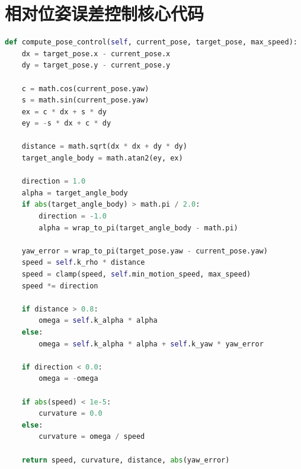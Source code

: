 \section{相对位姿误差控制核心代码}

\begin{lstlisting}[language=Python]
def compute_pose_control(self, current_pose, target_pose, max_speed):
    dx = target_pose.x - current_pose.x
    dy = target_pose.y - current_pose.y

    c = math.cos(current_pose.yaw)
    s = math.sin(current_pose.yaw)
    ex = c * dx + s * dy
    ey = -s * dx + c * dy

    distance = math.sqrt(dx * dx + dy * dy)
    target_angle_body = math.atan2(ey, ex)

    direction = 1.0
    alpha = target_angle_body
    if abs(target_angle_body) > math.pi / 2.0:
        direction = -1.0
        alpha = wrap_to_pi(target_angle_body - math.pi)

    yaw_error = wrap_to_pi(target_pose.yaw - current_pose.yaw)
    speed = self.k_rho * distance
    speed = clamp(speed, self.min_motion_speed, max_speed)
    speed *= direction

    if distance > 0.8:
        omega = self.k_alpha * alpha
    else:
        omega = self.k_alpha * alpha + self.k_yaw * yaw_error

    if direction < 0.0:
        omega = -omega

    if abs(speed) < 1e-5:
        curvature = 0.0
    else:
        curvature = omega / speed

    return speed, curvature, distance, abs(yaw_error)
\end{lstlisting}
